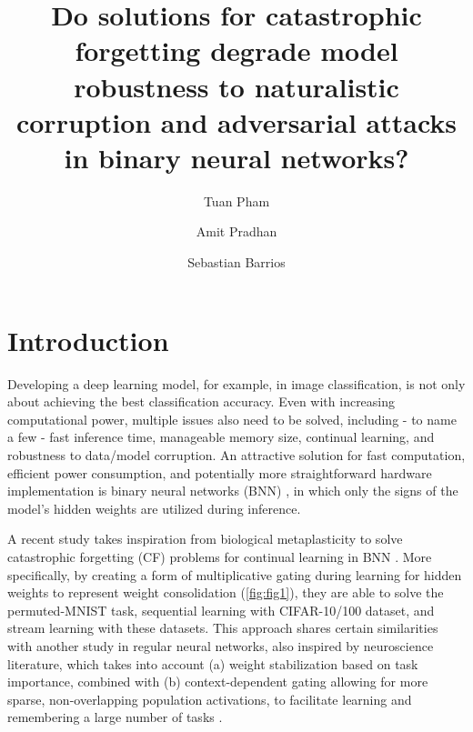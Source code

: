 \documentclass[manuscript,screen,review=false, nonacm]{acmart}
\begin{document}
\title[Continual learning vesus robustness]{Do solutions for catastrophic forgetting degrade model robustness to naturalistic corruption and adversarial attacks in binary neural networks?}

\author{Tuan Pham}

\author{Amit Pradhan}

\author{Sebastian Barrios}



\maketitle

\section{Introduction}
Developing a deep learning model, for example, in image classification, is not only about achieving the best classification accuracy. Even with increasing computational power, multiple issues also need to be solved, including - to name a few - fast inference time, manageable memory size, continual learning, and robustness to data/model corruption. An attractive solution for fast computation, efficient power consumption, and potentially more straightforward hardware implementation is binary neural networks (BNN) \cite{DBLP:journals/corr/CourbariauxB16}, in which only the signs of the model’s hidden weights are utilized during inference. 

A recent study takes inspiration from biological metaplasticity to solve catastrophic forgetting (CF) problems for continual learning in BNN \cite{Laborieux_Ernoult_Hirtzlin_Querlioz_2021}. More specifically, by creating a form of multiplicative gating during learning for hidden weights to represent weight consolidation (\autoref{fig:fig1}), they are able to solve the permuted-MNIST task, sequential learning with CIFAR-10/100 dataset, and stream learning with these datasets. This approach shares certain similarities with another study in regular neural networks, also inspired by neuroscience literature, which takes into account (a) weight stabilization based on task importance, combined with (b) context-dependent gating allowing for more sparse, non-overlapping population activations, to facilitate learning and remembering a large number of tasks \cite{Masse_2018}. 
\end{document}
